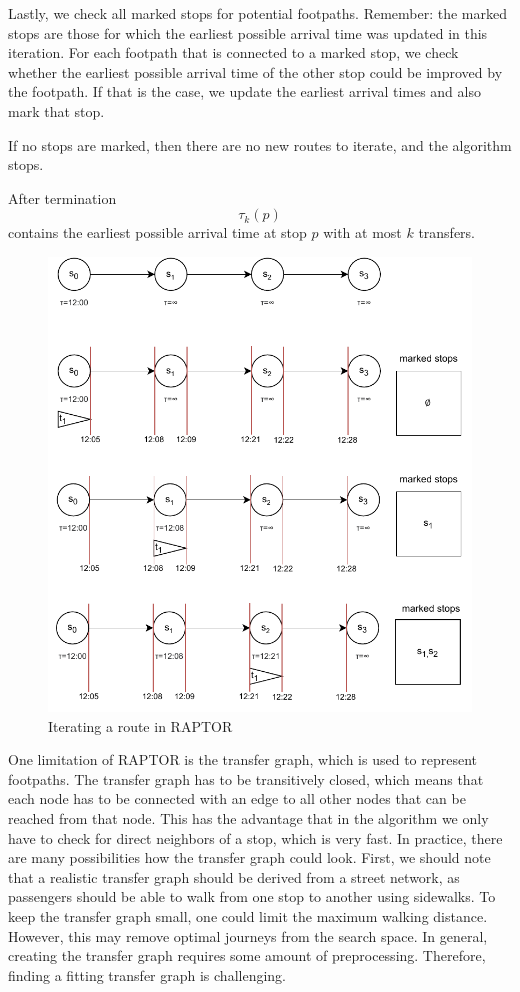 Lastly, we check all marked stops for potential footpaths.
Remember: the marked stops are those for which the earliest possible arrival time was updated in this iteration.
For each footpath that is connected to a marked stop, we check whether the earliest possible arrival time of the other stop could be improved by the footpath.
If that is the case, we update the earliest arrival times and also mark that stop.

If no stops are marked, then there are no new routes to iterate, and the algorithm stops.

After termination \[\tau_k(p)\] contains the earliest possible arrival time at stop \(p\) with at most \(k\) transfers.

\begin{figure}
    \centering
    \includegraphics{Figures/related_work/raptor.pdf}
    \caption{Iterating a route in RAPTOR}
    \label{fig:raptor}
\end{figure}

One limitation of RAPTOR is the transfer graph, which is used to represent footpaths.
The transfer graph has to be transitively closed, which means that each node has to be connected with an edge to all other nodes that can be reached from that node.
This has the advantage that in the algorithm we only have to check for direct neighbors of a stop, which is very fast.
In practice, there are many possibilities how the transfer graph could look.
First, we should note that a realistic transfer graph should be derived from a street network, as passengers should be able to walk from one stop to another using sidewalks.
To keep the transfer graph small, one could limit the maximum walking distance.
However, this may remove optimal journeys from the search space.
In general, creating the transfer graph requires some amount of preprocessing.
Therefore, finding a fitting transfer graph is challenging.

